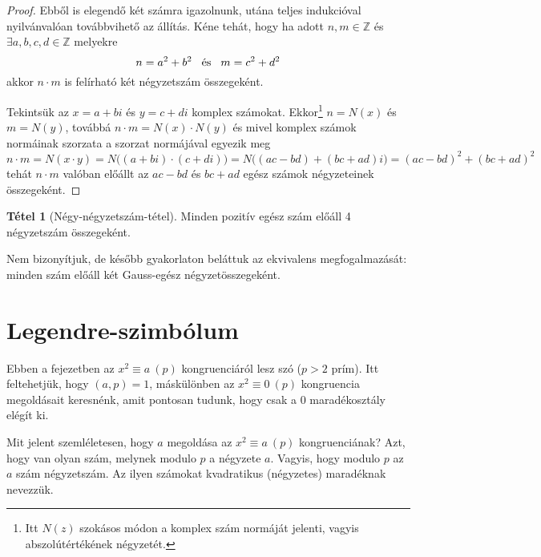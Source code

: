\documentclass[12pt]{book}
\theoremstyle{plain} %
\theoremstyle{definition} %
\newtheorem{theo/}{Tétel}[section]
\newenvironment{theo}
  {\renewcommand{\qedsymbol}{$\clubsuit$}%
   \pushQED{\qed}\begin{theo/}}
  {\popQED\end{theo/}}
\theoremstyle{remark}
\renewcommand\qedsymbol{$\blacksquare$}
\numberwithin{equation}{section}  %
\def\Z{\mathbb{Z}}
\begin{document}
\begin{proof}
		Ebből is elegendő két számra igazolnunk, utána teljes indukcióval nyilvánvalóan továbbvihető az állítás. Kéne tehát, hogy ha adott $n,m\in \Z$ és $\exists a,b,c,d\in \Z$ melyekre
		\[ n = a^2 + b^2 \hspace{3mm} \text{és} \hspace{3mm} m = c^2+d^2  \]
		akkor $n\cdot m$ is felírható két négyzetszám összegeként.
		
		Tekintsük az $x=a+bi$ és $y=c+di$ komplex számokat. Ekkor\footnote{Itt $N(z)$ szokásos módon a komplex szám normáját jelenti, vagyis abszolútértékének négyzetét.} $n=N(x)$ és $m=N(y)$, továbbá $n\cdot m = N(x)\cdot N(y)$ és mivel komplex számok normáinak szorzata a szorzat normájával egyezik meg
		\[ n\cdot m = N(x\cdot y) = N\Big ((a+bi)\cdot(c+di) \Big) = N\Big ((ac - bd) + (bc+ad)i \Big) = (ac-bd)^2 + (bc+ad)^2  \]
		tehát $n\cdot m$ valóban előállt az $ac-bd$ és $bc+ad$ egész számok négyzeteinek összegeként.
	\end{proof}
	
	\begin{theo}[Négy-négyzetszám-tétel]
		Minden pozitív egész szám előáll 4 négyzetszám összegeként.
	\end{theo}
	Nem bizonyítjuk, de később gyakorlaton beláttuk az ekvivalens megfogalmazását: minden szám előáll két Gauss-egész négyzetösszegeként.
	
	
	
	\section{Legendre-szimbólum}
	
	Ebben a fejezetben az $x^2\equiv a\ (p)$ kongruenciáról lesz szó ($p>2$ prím). Itt feltehetjük, hogy $(a,p)=1$, máskülönben az $x^2\equiv 0\ (p)$ kongruencia megoldásait keresnénk, amit pontosan tudunk, hogy csak a $0$ maradékosztály elégít ki.
	
	Mit jelent szemléletesen, hogy $a$ megoldása az $x^2\equiv a\ (p)$ kongruenciának? Azt, hogy van olyan szám, melynek modulo $p$ a négyzete $a$. Vagyis, hogy modulo $p$ az $a$ szám négyzetszám. Az ilyen számokat kvadratikus (négyzetes) maradéknak nevezzük.
	
\end{document}
